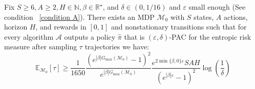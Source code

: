 \documentclass[final,12pt]{colt2026} %
\begin{document}
\begin{theorem}\label{th:lower_bound_theorem}
Fix $S \geq 6, A \geq 2, H \in \mathbb{N}, \beta \in \mathbb{R}^\star$, and $ \delta \in (0, 1/16)$ and $\varepsilon$ small enough (See condition ~\eqref{condition A}). There exists an MDP $\mathcal{M}_0$ with $S$ states, $A$ actions, horizon $H$, and rewards in $[0, 1]$ and nonstationary transitions such that for every algorithm $\mathcal{A}$ outputs a policy $\hat{\pi}$ that is $(\varepsilon, \delta)$-PAC for the entropic risk measure after sampling $\tau$ trajectories we have: 
$$\mathbb{E}_{\mathcal{M}_0}[\tau] \geq \frac{1}{1650} \frac{(e^{|\beta| G_{\max}(\mathcal{M}_0)} - 1)^2}{e^{|\beta| G_{\max}(\mathcal{M}_0)}} \frac{e^{2\min \{\beta,0\}\varepsilon}SAH}{(e^{|\beta| \varepsilon} - 1)^2} \log \left( \frac{1}{\delta} \right)$$
\end{theorem}
\end{document}
